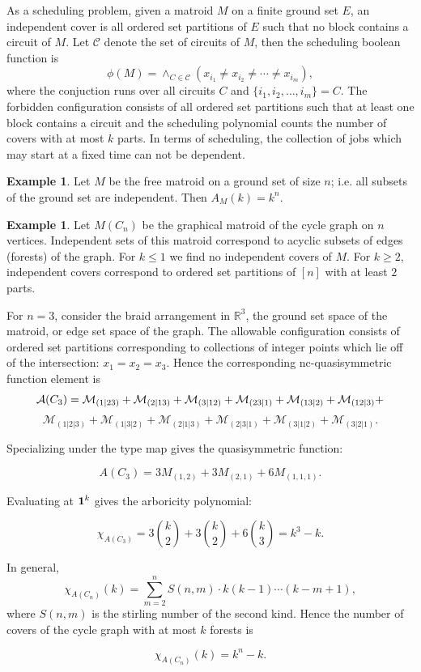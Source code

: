 \documentclass[12pt,reqno]{amsart}
\numberwithin{definition}{section}
\theoremstyle{definition}
\newtheorem{example}[definition]{Example}
\newcommand{\ncM}{\mathcal{M}}
\begin{document}
As a scheduling problem, given a matroid $M$ on a finite ground set
$E$, an independent cover is all ordered set partitions of $E$ such
that no block contains a circuit of $M$. Let $\mathcal{C}$ denote the set of circuits of $M$, then the scheduling boolean function is
$$\phi(M) = \wedge_{C \in \mathcal{C}} (x_{i_1} \neq x_{i_2} \neq \cdots \neq x_{i_m}),$$
where the conjuction runs over all circuits $C$ and $\{i_1, i_2, \ldots, i_m\} = C$.
The forbidden configuration consists of all ordered set partitions such that at least one block contains a circuit and the scheduling polynomial counts the number of covers with at most $k$ parts.   In terms of scheduling, the collection of jobs which may start at a fixed time can not be dependent.  

\begin{example}

Let $M$ be the free matroid on a ground set of size $n$; i.e. all subsets of the ground set are independent.  Then $A_M(k) = k^n$.  

\end{example}

\begin{example}

Let $M(C_n)$ be the graphical matroid of the cycle graph on $n$
vertices.  Independent sets of this matroid correspond to acyclic
subsets of edges (forests) of the graph.  For $k \leq 1$ we find no
independent covers of $M$.  For $k \geq 2$, independent covers
correspond to ordered set partitions of $[n]$ with at least $2$ parts.


For $n=3$,  consider the braid arrangement in $\mathbb{R}^3$, the ground set space of the
matroid, or edge set space of the graph.  The allowable configuration consists of ordered set partitions
corresponding to collections of integer points which lie off of the
intersection: $x_1 = x_2 = x_3$. Hence the corresponding nc-quasisymmetric function element is 
$${\bf{{\mathcal A}}}(C_3) = \ncM_{(1|23)} + \ncM_{(2|13)} + \ncM_{(3|12)} + \ncM_{(23|1)} + \ncM_{(13|2)} +  \ncM_{(12|3)} + $$ $$ \ncM_{(1|2|3)} + \ncM_{(1|3|2)}
+ \ncM_{(2|1|3)} + \ncM_{(2|3|1)} + \ncM_{(3|1|2)} + \ncM_{(3|2|1)}. $$

\noindent Specializing under the type map gives the quasisymmetric function:

$${ A}(C_3) = 3 M_{(1,2)} + 3 M_{(2,1)} + 6 M_{(1,1,1)}. $$

\noindent Evaluating at ${\bf 1}^k $ gives the arboricity polynomial:

$$ \chi_{A(C_3)} = 3 { k \choose 2} + 3 { k \choose 2} + 6 { k \choose 3} = k^3 - k. $$

In general,
$$\chi_{A(C_n)}(k) = \sum_{m=2}^{n} S(n,m) \cdot k(k-1) \cdots (k-m+1), $$
where $S(n,m)$ is the stirling number of the second kind. 
Hence the number of covers of the cycle graph with at most $k$ forests is

$$\chi_{A(C_n)}(k) = k^n - k. $$

\end{example}
\end{document}
